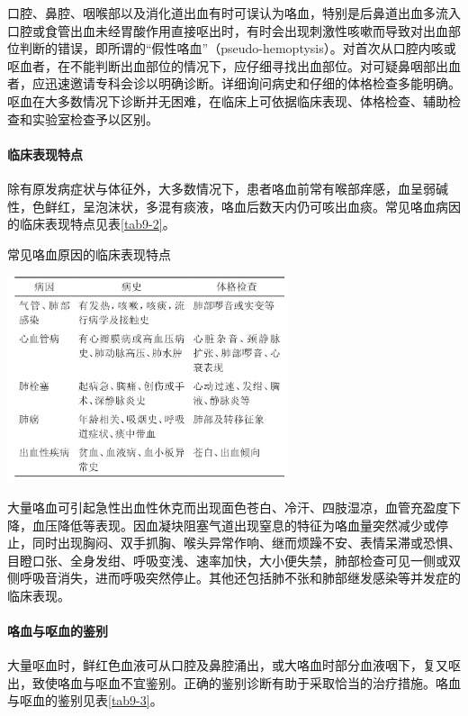 口腔、鼻腔、咽喉部以及消化道出血有时可误认为咯血，特别是后鼻道出血多流入口腔或食管出血未经胃酸作用直接呕出时，有时会出现刺激性咳嗽而导致对出血部位判断的错误，即所谓的“假性咯血”（pseudo-hemoptysis）。对首次从口腔内咳或呕血者，在不能判断出血部位的情况下，应仔细寻找出血部位。对可疑鼻咽部出血者，应迅速邀请专科会诊以明确诊断。详细询问病史和仔细的体格检查多能明确。呕血在大多数情况下诊断并无困难，在临床上可依据临床表现、体格检查、辅助检查和实验室检查予以区别。

\paragraph{临床表现特点}

除有原发病症状与体征外，大多数情况下，患者咯血前常有喉部痒感，血呈弱碱性，色鲜红，呈泡沫状，多混有痰液，咯血后数天内仍可咳出血痰。常见咯血病因的临床表现特点见表\ref{tab9-2}。

\begin{table}[htbp]
\centering
\caption{常见咯血原因的临床表现特点}
\label{tab9-2}
\includegraphics[width=3.26042in,height=2.38542in]{./images/Image00046.jpg}
\end{table}

大量咯血可引起急性出血性休克而出现面色苍白、冷汗、四肢湿凉，血管充盈度下降，血压降低等表现。因血凝块阻塞气道出现窒息的特征为咯血量突然减少或停止，同时出现胸闷、双手抓胸、喉头异常作响、继而烦躁不安、表情呆滞或恐惧、目瞪口张、全身发绀、呼吸变浅、速率加快，大小便失禁，肺部检查可见一侧或双侧呼吸音消失，进而呼吸突然停止。其他还包括肺不张和肺部继发感染等并发症的临床表现。

\paragraph{咯血与呕血的鉴别}

大量呕血时，鲜红色血液可从口腔及鼻腔涌出，或大咯血时部分血液咽下，复又呕出，致使咯血与呕血不宜鉴别。正确的鉴别诊断有助于采取恰当的治疗措施。咯血与呕血的鉴别见表\ref{tab9-3}。

